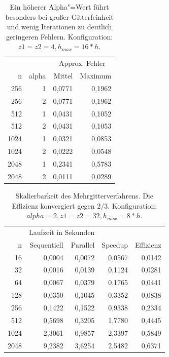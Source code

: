 \documentclass[paper = a4]{scrartcl}
\begin{document}
\begin{table}[ht]
    \centering
    \begin{tabular}{|r|r|r|r|} \hline
    & & \multicolumn{2}{c|}{Approx. Fehler} \\
    n    & alpha & Mittel & Maximum \\ \hline \hline
    256  & 1     & 0,0771 & 0,1962  \\
    256  & 2     & 0,0771 & 0,1962  \\
    512  & 1     & 0,0431 & 0,1052  \\
    512  & 2     & 0,0431 & 0,1053  \\
    1024 & 1     & 0,0321 & 0,0853  \\
    1024 & 2     & 0,0222 & 0,0548  \\
    2048 & 1     & 0,2341 & 0,5783  \\
    2048 & 2     & 0,0111 & 0,0289  \\ \hline
    \end{tabular}
    \caption{Ein höherer Alpha"=Wert führt besonders bei großer Gitterfeinheit und wenig Iterationen zu deutlich geringeren Fehlern. Konfiguration: \(z1=z2=4, h_{max} = 16*h\).}
    \label{tab:c}
\end{table}

\begin{table}[ht]
    \centering
    \begin{tabular}{|r|r|r|r|r|} \hline
    & \multicolumn{2}{c|}{Laufzeit in Sekunden} & & \\
    n    & Sequentiell & Parallel & Speedup & Effizienz \\ \hline \hline
    16   & 0,0004      & 0,0072   & 0,0567  & 0,0142    \\
    32   & 0,0016      & 0,0139   & 0,1124  & 0,0281    \\
    64   & 0,0067      & 0,0379   & 0,1765  & 0,0441    \\
    128  & 0,0350      & 0,1045   & 0,3352  & 0,0838    \\
    256  & 0,1422      & 0,1522   & 0,9338  & 0,2334    \\
    512  & 0,5698      & 0,3205   & 1,7780  & 0,4445    \\
    1024 & 2,3061      & 0,9857   & 2,3397  & 0,5849    \\
    2048 & 9,2382      & 3,6254   & 2,5482  & 0,6371    \\ \hline
    \end{tabular}
    \caption{Skalierbarkeit des Mehrgitterverfahrens. Die Effizienz konvergiert gegen $2/3$. Konfiguration: \(alpha=2, z1=z2=32, h_{max} = 8*h\).}
    \label{tab:e}
\end{table}
\end{document}

